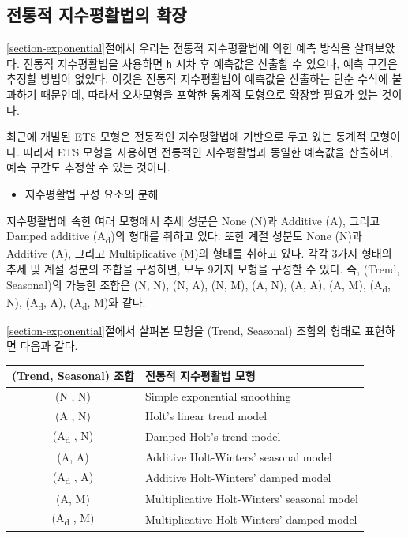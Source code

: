 \documentclass[
]{book}
\providecommand{\tightlist}{%
  \setlength{\itemsep}{0pt}\setlength{\parskip}{0pt}}
\begin{document}
\hypertarget{uxc804uxd1b5uxc801-uxc9c0uxc218uxd3c9uxd65cuxbc95uxc758-uxd655uxc7a5}{%
\subsection{전통적 지수평활법의 확장}\label{uxc804uxd1b5uxc801-uxc9c0uxc218uxd3c9uxd65cuxbc95uxc758-uxd655uxc7a5}}

\ref{section-exponential}절에서 우리는 전통적 지수평활법에 의한 예측 방식을 살펴보았다. 전통적 지수평활법을 사용하면 \texttt{h} 시차 후 예측값은 산출할 수 있으나, 예측 구간은 추정할 방법이 없었다. 이것은 전통적 지수평활법이 예측값을 산출하는 단순 수식에 불과하기 때문인데, 따라서 오차모형을 포함한 통계적 모형으로 확장할 필요가 있는 것이다.

최근에 개발된 ETS 모형은 전통적인 지수평활법에 기반으로 두고 있는 통계적 모형이다. 따라서 ETS 모형을 사용하면 전통적인 지수평활법과 동일한 예측값을 산출하며, 예측 구간도 추정할 수 있는 것이다.

\begin{itemize}
\tightlist
\item
  지수평활법 구성 요소의 분해
\end{itemize}

지수평활법에 속한 여러 모형에서 추세 성분은 None (N)과 Additive (A), 그리고 Damped additive (A\textsubscript{d})의 형태를 취하고 있다. 또한 계절 성분도 None (N)과 Additive (A), 그리고 Multiplicative (M)의 형태를 취하고 있다. 각각 3가지 형태의 추세 및 계절 성분의 조합을 구성하면, 모두 9가지 모형을 구성할 수 있다. 즉, (Trend, Seasonal)의 가능한 조합은 (N, N), (N, A), (N, M), (A, N), (A, A), (A, M), (A\textsubscript{d}, N), (A\textsubscript{d}, A), (A\textsubscript{d}, M)와 같다.

\ref{section-exponential}절에서 살펴본 모형을 (Trend, Seasonal) 조합의 형태로 표현하면 다음과 같다.

\begin{longtable}[]{@{}cl@{}}
\toprule
(Trend, Seasonal) 조합 & 전통적 지수평활법 모형 \\
\midrule
\endhead
(N , N) & Simple exponential smoothing \\
(A , N) & Holt's linear trend model \\
(A\textsubscript{d} , N) & Damped Holt's trend model \\
(A, A) & Additive Holt-Winters' seasonal model \\
(A\textsubscript{d} , A) & Additive Holt-Winters' damped model \\
(A, M) & Multiplicative Holt-Winters' seasonal model \\
(A\textsubscript{d} , M) & Multiplicative Holt-Winters' damped model \\
\bottomrule
\end{longtable}
\end{document}
